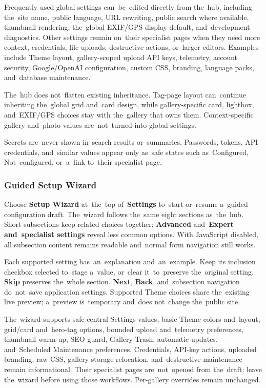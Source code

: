 \documentclass[11pt,a4paper]{article}
\newcommand{\ui}[1]{\textbf{#1}}
\begin{document}
Frequently used global settings can~be~edited directly from the~hub, including
the~site name, public language, URL rewriting, public search where available,
thumbnail rendering, the~global EXIF/GPS display default, and~development
diagnostics. Other settings remain on~their specialist pages when they need more
context, credentials, file uploads, destructive actions, or~larger editors.
Examples include Theme layout, gallery-scoped upload API keys, telemetry,
account security, Google/OpenAI configuration, custom CSS, branding, language
packs, and~database maintenance.

The~hub does not~flatten existing inheritance. Tag-page layout can~continue
inheriting the~global grid and~card design, while gallery-specific card,
lightbox, and~EXIF/GPS choices stay with the~gallery that owns them.
Context-specific gallery and~photo values are~not~turned into global settings.

Secrets are~never shown in~search results or~summaries. Passwords, tokens, API
credentials, and~similar values appear only as~safe states such as~Configured,
Not~configured, or~a~link to~their specialist page.

\subsubsection{Guided Setup Wizard}

Choose \ui{Setup Wizard} at~the~top of~\ui{Settings} to~start or~resume a~guided
configuration draft. The~wizard follows the~same eight sections as~the~hub.
Short subsections keep related choices together; \ui{Advanced} and~\ui{Expert
and~specialist settings} reveal less common options. With JavaScript disabled,
all subsection content remains readable and~normal form navigation still works.

Each supported setting has~an~explanation and~an~example. Keep its inclusion
checkbox selected to~stage a~value, or~clear it~to~preserve the~original
setting. \ui{Skip} preserves the~whole section. \ui{Next}, \ui{Back},
and~subsection navigation do~not~save application settings. Supported Theme
choices share the~existing live preview; a~preview is~temporary and~does
not~change the~public site.

The~wizard supports safe central Settings values, basic Theme colors and~layout,
grid/card and~hero-tag options, bounded upload and~telemetry preferences,
thumbnail warm-up, SEO guard, Gallery Trash, automatic updates, and~Scheduled
Maintenance preferences. Credentials, API-key actions, uploaded branding, raw
CSS, gallery-storage relocation, and~destructive maintenance remain
informational. Their specialist pages are~not~opened from the~draft; leave
the~wizard before using those workflows. Per-gallery overrides remain unchanged.
\end{document}
